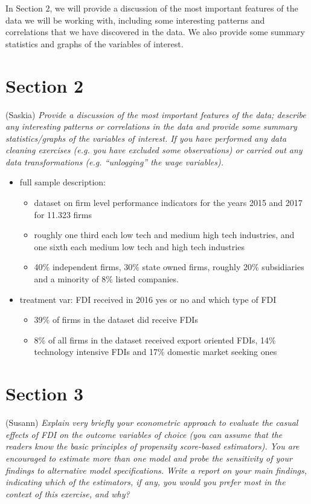 \documentclass[11pt,a4paper,leqno]{article}
\begin{document}
In Section $2$, we will provide a discussion of the most important features of the data we will be working with, including some interesting patterns and correlations that we have discovered in the data. We also provide some summary statistics and graphs of the variables of interest.

\section*{Section 2} (Saskia)
\textit{Provide a discussion of the most important features of the data; describe any interesting patterns or correlations in the data and provide some summary statistics/graphs of the variables of interest. If you have performed any data cleaning exercises (e.g. you have excluded some observations) or carried out any data transformations (e.g. “unlogging” the wage variables).}

\begin{itemize}
	\item full sample description:
	\begin{itemize}
		\item dataset on firm level performance indicators for the years 2015 and 2017 for 11.323 firms  
		\item roughly one third each low tech and medium high tech industries, and one sixth each medium low tech and high tech industries
		\item 40\% independent firms, 30\% state owned firms, roughly 20\% subsidiaries and a minority of 8\% listed companies.  
	\end{itemize}
	\item treatment var: FDI received in 2016 yes or no and which type of FDI
	\begin{itemize}
		\item 39\% of firms in the dataset did receive FDIs
		\item 8\% of all firms in the dataset received export oriented FDIs, 14\% technology intensive FDIs and 17\% domestic market seeking ones
	\end{itemize}

\end{itemize}

\section*{Section 3} (Susann)
\textit{Explain very briefly your econometric approach to evaluate the casual effects of FDI on the outcome variables of choice (you can assume that the readers know the basic principles of propensity score-based estimators). You are encouraged to estimate more than one model and probe the sensitivity of your findings to alternative model specifications. Write a report on your main findings, indicating which of the estimators, if any, you would you prefer most in the context of this exercise, and why?}
\end{document}
